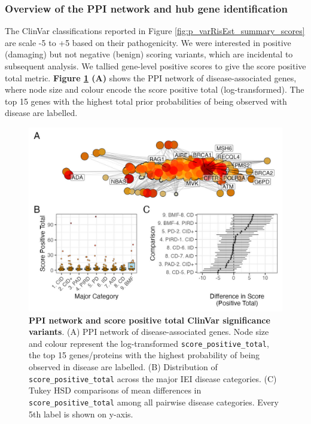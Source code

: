 \subsubsection{Overview of the PPI network and hub gene identification}

The ClinVar classifications reported in 
Figure \ref{fig:p_varRisEst_summary_scores} are scale -5 to +5 based on their pathogenicity. 
We were interested in positive (damaging) but not negative (benign) scoring variants, which are incidental to subsequent analysis. 
We tallied gene-level positive scores to give the score positive total metric. 
\textbf{Figure \ref{fig:ppi_network_assoc} (A)} shows the PPI network of disease-associated genes, where node size and colour encode the score positive total (log-transformed). 
The top 15 genes with the highest total prior probabilities of being observed with disease are labelled.

\begin{figure}[ht]
  \centering
  \includegraphics[width=\textwidth]{../images/untangleR_ppi_network_assoc_patch1.jpg}
  \caption{\textbf{PPI network and score positive total ClinVar significance variants}.
    (A) PPI network of disease-associated genes. Node size and colour represent the log-transformed \texttt{score\_positive\_total}, the top 15 genes/proteins with the highest probability of being observed in disease are labelled.
    (B) Distribution of \texttt{score\_positive\_total} across the major IEI disease categories.
    (C) Tukey HSD comparisons of mean differences in \texttt{score\_positive\_total} among all pairwise disease categories. Every 5th label is shown on y-axis.
  }
  \label{fig:ppi_network_assoc}
\end{figure}


